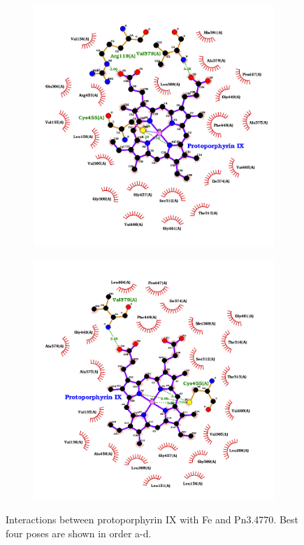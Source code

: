 \documentclass[12pt]{article}
\begin{document}
\begin{figure}[h!]
\begin{subfigure}[h!]{0.35\textwidth}
			\caption{}
		\end{subfigure}
		\hfill
		\begin{subfigure}[h!]{0.35\textwidth}
			\hspace{2cm}
			\includegraphics[width=\textwidth]{../5/known/Dock/best3.png}
			\caption{}
		\end{subfigure}
		\hfill
		\begin{subfigure}[h!]{0.35\textwidth}
			\hspace{-2cm}
			\includegraphics[width=\textwidth]{../5/known/Dock/best4.png}
			\caption{}
		\end{subfigure}
		\hfill
		\caption[Interactions between protoporphyrin IX with Fe and Pn3.4770.]{Interactions between protoporphyrin IX with Fe and Pn3.4770. Best four poses are shown in order a-d.}
		\label{fig5k_4}
	\end{figure}
\end{document}
